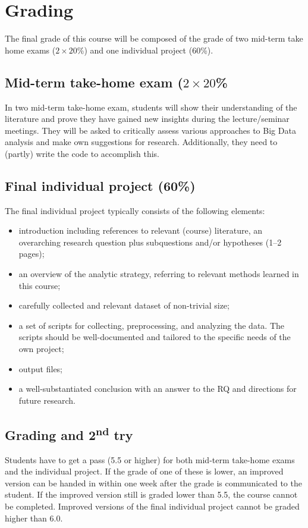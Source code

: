 \documentclass[a4paper,12pt]{report}
\begin{document}
\section*{Grading}

The final grade of this course will be composed of the grade of two mid-term take home exams ($2 \times 20$\%) and one individual project (60\%).

\subsection*{Mid-term take-home exam ($2 \times 20$\%}
In two mid-term take-home exam, students will show their understanding of the literature and prove they have gained new insights during the lecture/seminar meetings. They will be asked to critically assess various approaches to Big Data analysis and make own suggestions for research. Additionally, they need to (partly) write the code to accomplish this.

\subsection*{Final individual project (60\%)}
The final individual project typically consists of the following elements:
\begin{itemize}
\item introduction including references to relevant (course) literature, an overarching research question plus subquestions and/or hypotheses (1–2 pages);
\item an overview of the analytic strategy, referring to relevant methods learned in this course;
\item carefully collected and relevant dataset of non-trivial size;
\item a set of scripts for collecting, preprocessing, and analyzing the data. The scripts should be well-documented and tailored to the specific needs of the own project;
\item output files;
\item a well-substantiated conclusion with an answer to the RQ and directions for future research.
\end{itemize}

\subsection*{Grading and 2\textsuperscript{nd} try}
Students have to get a pass (5.5 or higher) for both mid-term take-home exams and the individual project. If the grade of one of these is lower, an improved version can be handed in within one week after the grade is communicated to the student. If the improved version still is graded lower than 5.5, the course cannot be completed. Improved versions of the final individual project cannot be graded higher than 6.0. 
\end{document}
